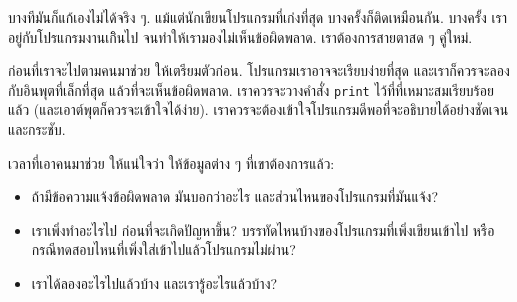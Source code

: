 
บางทีมันก็แก้เองไม่ได้จริง ๆ.
แม้แต่นักเขียนโปรแกรมที่เก่งที่สุด บางครั้งก็ติดเหมือนกัน.
บางครั้ง เราอยู่กับโปรแกรมงานเกิินไป
จนทำให้เรามองไม่เห็นข้อผิดพลาด.
เราต้องการสายตาสด ๆ คู่ใหม่.


ก่อนที่เราจะไปตามคนมาช่วย
ให้เตรียมตัวก่อน.
โปรแกรมเราอาจจะเรียบง่ายที่สุด
และเราก็ควรจะลองกับอินพุตที่เล็กที่สุด แล้วที่จะเห็นข้อผิดพลาด.
เราควรจะวางคำสั่ง \texttt{print} ไว้ที่ที่เหมาะสมเรียบร้อยแล้ว (และเอาต์พุตก็ควรจะเข้าใจได้ง่าย).
เราควรจะต้องเข้าใจโปรแกรมดีพอที่จะอธิบายได้อย่างชัดเจน และกระชับ.


เวลาที่เอาคนมาช่วย
ให้แน่ใจว่า ให้ข้อมูลต่าง ๆ ที่เขาต้องการแล้ว:

\begin{itemize}

\item ถ้ามีข้อความแจ้งข้อผิดพลาด
มันบอกว่าอะไร
และส่วนไหนของโปรแกรมที่มันแจ้ง?


\item เราเพิ่งทำอะไรไป ก่อนที่จะเกิดปัญหาขึ้น?
บรรทัดไหนบ้างของโปรแกรมที่เพิ่งเขียนเข้าไป
หรือกรณีทดสอบไหนที่เพิ่งใส่เข้าไปแล้วโปรแกรมไม่ผ่าน?

\item เราได้ลองอะไรไปแล้วบ้าง และเรารู้อะไรแล้วบ้าง?


\end{itemize}

